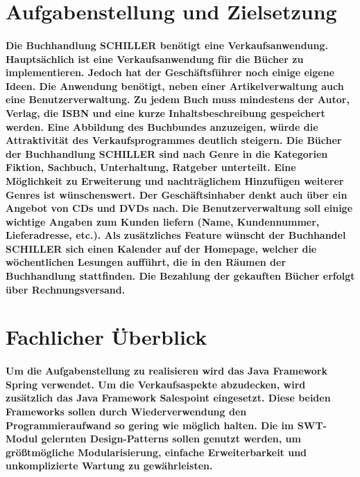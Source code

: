 \documentclass[a4paper]{article}
\begin{document}
\newpage


\tableofcontents

\newpage
 
\section{Aufgabenstellung und Zielsetzung}

\paragraph{Die Buchhandlung SCHILLER benötigt eine Verkaufsanwendung. Hauptsächlich ist eine Verkaufsanwendung für die Bücher zu implementieren. Jedoch hat der Geschäftsführer noch einige eigene Ideen. 
Die Anwendung benötigt, neben einer Artikelverwaltung auch eine Benutzerverwaltung. Zu jedem Buch muss mindestens der Autor, Verlag, die ISBN und eine kurze Inhaltsbeschreibung gespeichert werden. Eine Abbildung des Buchbundes anzuzeigen, würde die Attraktivität des Verkaufsprogrammes deutlich steigern. Die Bücher der Buchhandlung SCHILLER sind nach Genre in die Kategorien Fiktion, Sachbuch, Unterhaltung, Ratgeber unterteilt. Eine Möglichkeit zu Erweiterung und nachträglichem Hinzufügen weiterer Genres ist wünschenswert. Der Geschäftsinhaber denkt auch über ein Angebot von CDs und DVDs nach. Die Benutzerverwaltung soll einige wichtige Angaben zum Kunden liefern (Name, Kundennummer, Lieferadresse, etc.). 
Als zusätzliches Feature wünscht der Buchhandel SCHILLER sich einen Kalender auf der Homepage, welcher die wöchentlichen Lesungen aufführt, die in den Räumen der Buchhandlung stattfinden. Die Bezahlung der gekauften Bücher erfolgt über Rechnungsversand.}

\section{Fachlicher Überblick}

\paragraph{Um die Aufgabenstellung zu realisieren wird das Java Framework Spring verwendet. Um die Verkaufsaspekte abzudecken, wird zusätzlich das Java Framework Salespoint eingesetzt. Diese beiden Frameworks sollen durch Wiederverwendung den Programmieraufwand so gering wie möglich halten. Die im SWT-Modul gelernten Design-Patterns sollen genutzt werden, um größtmögliche Modularisierung, einfache Erweiterbarkeit und unkomplizierte Wartung zu gewährleisten.}
\end{document}

